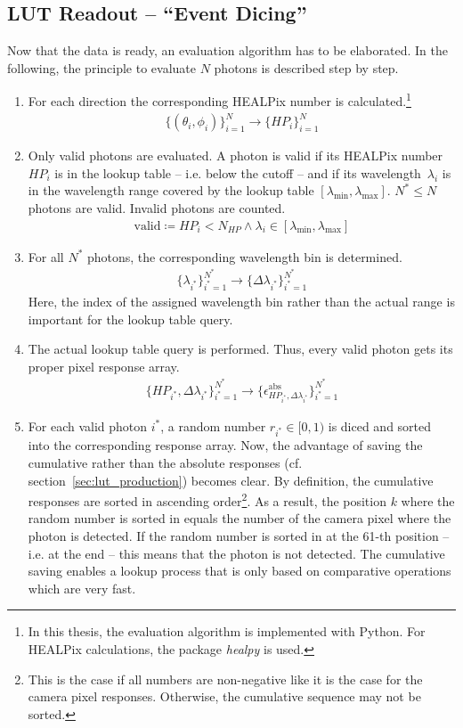 \subsection{LUT Readout -- \enquote{Event Dicing}}\label{sec:lut_readout}

Now that the data is ready, an evaluation algorithm has to be elaborated. In the following, the principle to evaluate $N$ photons is described step by step.

\begin{enumerate}
	\item For each direction the corresponding HEALPix number is calculated.\footnote{In this thesis, the evaluation algorithm is implemented with Python. For HEALPix calculations, the package \textit{healpy} is used.}
	\begin{align}
		\{(\theta_i, \phi_i)\}_{i=1}^N \rightarrow \{HP_i\}_{i=1}^N
	\end{align}
	\item Only valid photons are evaluated. A photon is valid if its HEALPix number~$HP_i$ is in the lookup table -- i.e. below the cutoff -- and if its wavelength~$\lambda_i$ is in the wavelength range covered by the lookup table $[\lambda_\text{min},\lambda_\text{max}]$. $N^\ast\leq N$ photons are valid. Invalid photons are counted.
	\begin{align}
		\text{valid} \coloneqq HP_i < N_{HP} \wedge \lambda_i \in [\lambda_\text{min},\lambda_\text{max}]
	\end{align} 
	\item For all $N^\ast$ photons, the corresponding wavelength bin is determined.
	\begin{align}
		\{\lambda_{i^\ast}\}_{i^\ast=1}^{N^\ast} \rightarrow \{ \Delta\lambda_{i^\ast} \}_{i^\ast=1}^{N^\ast}
	\end{align}
	Here, the index of the assigned wavelength bin rather than the actual range is important for the lookup table query.
	\item The actual lookup table query is performed. Thus, every valid photon gets its proper pixel response array.
	\begin{align}
		\{HP_{i^\ast}, \Delta\lambda_{i^\ast}\}_{i^\ast=1}^{N^\ast} \rightarrow \{ \epsilon^\text{abs}_{HP_{i^\ast},\Delta\lambda_{i^\ast}}\}_{i^\ast=1}^{N^\ast}
	\end{align}
	\item For each valid photon $i^\ast$, a random number $r_{i^\ast}\in[0,1)$ is diced and sorted into the corresponding response array. Now, the advantage of saving the cumulative rather than the absolute responses (cf. section~\ref{sec:lut_production}) becomes clear. By definition, the cumulative responses are sorted in ascending order\footnote{This is the case if all numbers are non-negative like it is the case for the camera pixel responses. Otherwise, the cumulative sequence may not be sorted.}. As a result, the position $k$ where the random number is sorted in equals the number of the camera pixel where the photon is detected. If the random number is sorted in at the \num{61}-th position -- i.e. at the end -- this means that the photon is not detected. The cumulative saving enables a lookup process that is only based on comparative operations which are very fast.

\end{enumerate}
